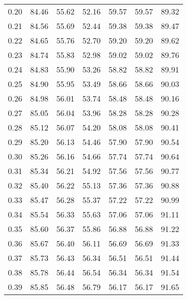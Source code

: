 \begin{tabular}{|c|c|c|c|c|c|c|}
      0.20 &     84.46 &     55.62 &      52.16 &   59.57 &      59.57 &         89.32 \\
      0.21 &     84.56 &     55.69 &      52.44 &   59.38 &      59.38 &         89.47 \\
      0.22 &     84.65 &     55.76 &      52.70 &   59.20 &      59.20 &         89.62 \\
      0.23 &     84.74 &     55.83 &      52.98 &   59.02 &      59.02 &         89.76 \\
      0.24 &     84.83 &     55.90 &      53.26 &   58.82 &      58.82 &         89.91 \\
      0.25 &     84.90 &     55.95 &      53.49 &   58.66 &      58.66 &         90.03 \\
      0.26 &     84.98 &     56.01 &      53.74 &   58.48 &      58.48 &         90.16 \\
      0.27 &     85.05 &     56.04 &      53.96 &   58.28 &      58.28 &         90.28 \\
      0.28 &     85.12 &     56.07 &      54.20 &   58.08 &      58.08 &         90.41 \\
      0.29 &     85.20 &     56.13 &      54.46 &   57.90 &      57.90 &         90.54 \\
      0.30 &     85.26 &     56.16 &      54.66 &   57.74 &      57.74 &         90.64 \\
      0.31 &     85.34 &     56.21 &      54.92 &   57.56 &      57.56 &         90.77 \\
      0.32 &     85.40 &     56.22 &      55.13 &   57.36 &      57.36 &         90.88 \\
      0.33 &     85.47 &     56.28 &      55.37 &   57.22 &      57.22 &         90.99 \\
      0.34 &     85.54 &     56.33 &      55.63 &   57.06 &      57.06 &         91.11 \\
      0.35 &     85.60 &     56.37 &      55.86 &   56.88 &      56.88 &         91.22 \\
      0.36 &     85.67 &     56.40 &      56.11 &   56.69 &      56.69 &         91.33 \\
      0.37 &     85.73 &     56.43 &      56.34 &   56.51 &      56.51 &         91.44 \\
      0.38 &     85.78 &     56.44 &      56.54 &   56.34 &      56.34 &         91.54 \\
      0.39 &     85.85 &     56.48 &      56.79 &   56.17 &      56.17 &         91.65 \\

\end{tabular}
